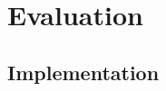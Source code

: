 \documentclass[11pt,a4paper]{article}
\begin{document}
%
%
%
\section{Evaluation}
\subsection{Implementation}
\end{document}
